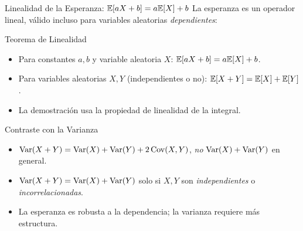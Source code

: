 \documentclass[10pt, aspectratio=169]{beamer}
\begin{document}
\begin{frame}{Linealidad de la Esperanza: $\mathbb{E}[aX + b] = a\mathbb{E}[X] + b$}
  \footnotesize
  La esperanza es un operador lineal, válido incluso para variables aleatorias \emph{dependientes}: \pause

  \vspace{0.1cm}
  \begin{block}{Teorema de Linealidad}
    \begin{itemize}\itemsep=0.05cm
      \item Para constantes $a, b$ y variable aleatoria $X$: $\mathbb{E}[aX + b] = a \mathbb{E}[X] + b$.
      \item Para variables aleatorias $X, Y$ (independientes o no): $\mathbb{E}[X + Y] = \mathbb{E}[X] + \mathbb{E}[Y]$.
      \item La demostración usa la propiedad de linealidad de la integral.
    \end{itemize}
  \end{block}

  \vspace{0.1cm}
  \pause
  \begin{alertblock}{Contraste con la Varianza}
    \begin{itemize}\itemsep=0.05cm
      \item $\operatorname{Var}(X + Y) = \operatorname{Var}(X) + \operatorname{Var}(Y) + 2\operatorname{Cov}(X, Y)$, \emph{no} $\operatorname{Var}(X) + \operatorname{Var}(Y)$ en general.
      \item $\operatorname{Var}(X + Y) = \operatorname{Var}(X) + \operatorname{Var}(Y)$ solo si $X, Y$ son \emph{independientes} o \emph{incorrelacionadas}.
      \item La esperanza es robusta a la dependencia; la varianza requiere más estructura.
    \end{itemize}
  \end{alertblock}
\end{frame}
\end{document}
